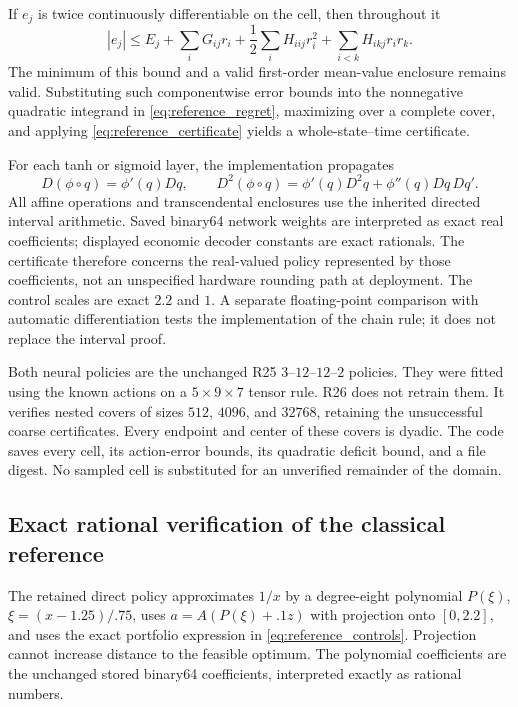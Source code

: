 \begin{theorem}\label{thm:jets}
If $e_j$ is twice continuously differentiable on the cell, then throughout it
\begin{equation}
 |e_j|\leq E_j+\sum_iG_{ij}r_i
 +\frac12\sum_iH_{iij}r_i^2+\sum_{i<k}H_{ikj}r_ir_k.\label{eq:jet}
\end{equation}
The minimum of this bound and a valid first-order mean-value enclosure remains valid. Substituting such componentwise error bounds into the nonnegative quadratic integrand in \eqref{eq:reference_regret}, maximizing over a complete cover, and applying \eqref{eq:reference_certificate} yields a whole-state--time certificate.
\end{theorem}
For each tanh or sigmoid layer, the implementation propagates
\[
 D(\phi\circ q)=\phi'(q)Dq,\qquad
 D^2(\phi\circ q)=\phi'(q)D^2q+\phi''(q)Dq\,Dq'.
\]
All affine operations and transcendental enclosures use the inherited directed interval arithmetic. Saved binary64 network weights are interpreted as exact real coefficients; displayed economic decoder constants are exact rationals. The certificate therefore concerns the real-valued policy represented by those coefficients, not an unspecified hardware rounding path at deployment. The control scales are exact $2.2$ and $1$. A separate floating-point comparison with automatic differentiation tests the implementation of the chain rule; it does not replace the interval proof.

Both neural policies are the unchanged R25 $3$--$12$--$12$--$2$ policies. They were fitted using the known actions on a $5\times9\times7$ tensor rule. R26 does not retrain them. It verifies nested covers of sizes $512$, $4096$, and $32768$, retaining the unsuccessful coarse certificates. Every endpoint and center of these covers is dyadic. The code saves every cell, its action-error bounds, its quadratic deficit bound, and a file digest. No sampled cell is substituted for an unverified remainder of the domain.

\subsection{Exact rational verification of the classical reference}\label{sec:bernstein}
The retained direct policy approximates $1/x$ by a degree-eight polynomial $P(\xi)$, $\xi=(x-1.25)/.75$, uses $a=A(P(\xi)+.1z)$ with projection onto $[0,2.2]$, and uses the exact portfolio expression in \eqref{eq:reference_controls}. Projection cannot increase distance to the feasible optimum. The polynomial coefficients are the unchanged stored binary64 coefficients, interpreted exactly as rational numbers.

